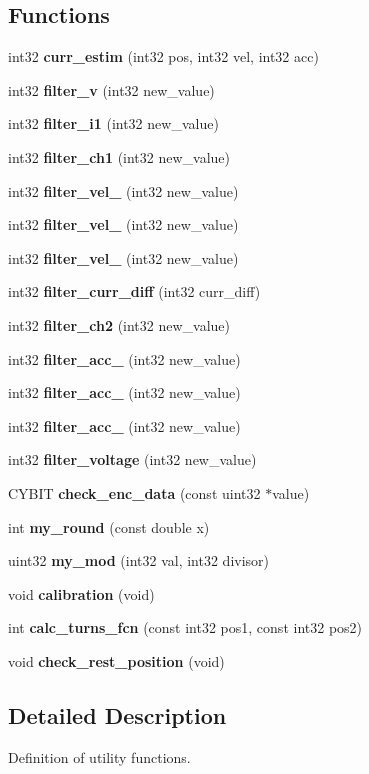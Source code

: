\subsection*{Functions}
\begin{DoxyCompactItemize}
\item 
int32 \textbf{ curr\+\_\+estim} (int32 pos, int32 vel, int32 acc)
\item 
int32 \textbf{ filter\+\_\+v} (int32 new\+\_\+value)
\item 
int32 \textbf{ filter\+\_\+i1} (int32 new\+\_\+value)
\item 
int32 \textbf{ filter\+\_\+ch1} (int32 new\+\_\+value)
\item 
int32 \textbf{ filter\+\_\+vel\+\_} (int32 new\+\_\+value)
\item 
int32 \textbf{ filter\+\_\+vel\+\_} (int32 new\+\_\+value)
\item 
int32 \textbf{ filter\+\_\+vel\+\_} (int32 new\+\_\+value)
\item 
int32 \textbf{ filter\+\_\+curr\+\_\+diff} (int32 curr\+\_\+diff)
\item 
int32 \textbf{ filter\+\_\+ch2} (int32 new\+\_\+value)
\item 
int32 \textbf{ filter\+\_\+acc\+\_} (int32 new\+\_\+value)
\item 
int32 \textbf{ filter\+\_\+acc\+\_} (int32 new\+\_\+value)
\item 
int32 \textbf{ filter\+\_\+acc\+\_} (int32 new\+\_\+value)
\item 
int32 \textbf{ filter\+\_\+voltage} (int32 new\+\_\+value)
\item 
C\+Y\+B\+IT \textbf{ check\+\_\+enc\+\_\+data} (const uint32 $\ast$value)
\item 
int \textbf{ my\+\_\+round} (const double x)
\item 
uint32 \textbf{ my\+\_\+mod} (int32 val, int32 divisor)
\item 
void \textbf{ calibration} (void)
\item 
int \textbf{ calc\+\_\+turns\+\_\+fcn} (const int32 pos1, const int32 pos2)
\item 
\mbox{\label{utils_8c_a13fca172b37b6f76749a864c1439b497}} 
void {\bfseries check\+\_\+rest\+\_\+position} (void)
\end{DoxyCompactItemize}


\subsection{Detailed Description}
Definition of utility functions. 

